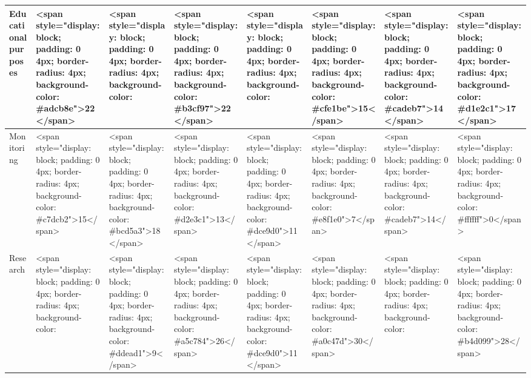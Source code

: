 \documentclass[
]{article}
\begin{document}
\begin{table}
\begin{tabular}[t]{l|l|l|l|l|l|l|l}
\hline
\hspace{1em}Educational purposes & <span style="display: block; padding: 0 4px; border-radius: 4px; background-color: #adcb8e">22</span> & <span style="display: block; padding: 0 4px; border-radius: 4px; background-color: #9ac075">27</span> & <span style="display: block; padding: 0 4px; border-radius: 4px; background-color: #b3cf97">22</span> & <span style="display: block; padding: 0 4px; border-radius: 4px; background-color: #98bf72">33</span> & <span style="display: block; padding: 0 4px; border-radius: 4px; background-color: #cfe1be">15</span> & <span style="display: block; padding: 0 4px; border-radius: 4px; background-color: #cadeb7">14</span> & <span style="display: block; padding: 0 4px; border-radius: 4px; background-color: #d1e2c1">17</span>\\
\hline
\hspace{1em}Monitoring & <span style="display: block; padding: 0 4px; border-radius: 4px; background-color: #c7dcb2">15</span> & <span style="display: block; padding: 0 4px; border-radius: 4px; background-color: #bcd5a3">18</span> & <span style="display: block; padding: 0 4px; border-radius: 4px; background-color: #d2e3c1">13</span> & <span style="display: block; padding: 0 4px; border-radius: 4px; background-color: #dce9d0">11</span> & <span style="display: block; padding: 0 4px; border-radius: 4px; background-color: #e8f1e0">7</span> & <span style="display: block; padding: 0 4px; border-radius: 4px; background-color: #cadeb7">14</span> & <span style="display: block; padding: 0 4px; border-radius: 4px; background-color: #ffffff">0</span>\\
\hline
\hspace{1em}Research & <span style="display: block; padding: 0 4px; border-radius: 4px; background-color: #75a942">37</span> & <span style="display: block; padding: 0 4px; border-radius: 4px; background-color: #ddead1">9</span> & <span style="display: block; padding: 0 4px; border-radius: 4px; background-color: #a5c784">26</span> & <span style="display: block; padding: 0 4px; border-radius: 4px; background-color: #dce9d0">11</span> & <span style="display: block; padding: 0 4px; border-radius: 4px; background-color: #a0c47d">30</span> & <span style="display: block; padding: 0 4px; border-radius: 4px; background-color: #84b256">33</span> & <span style="display: block; padding: 0 4px; border-radius: 4px; background-color: #b4d099">28</span>\\
\hline

\end{tabular}
\end{table}
\end{document}
